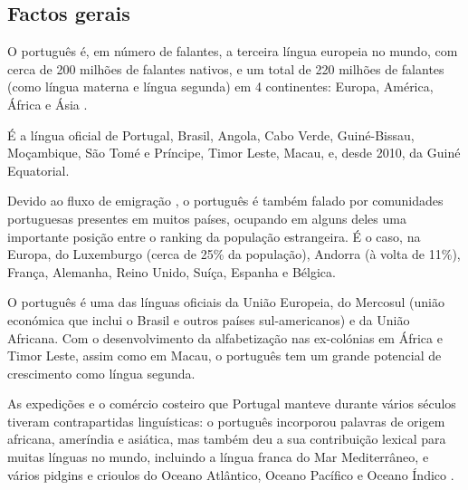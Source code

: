 \clearpage



\begin{multicols}{2}

\subsection{Factos gerais}

O português é, em número de falantes, a terceira língua europeia no mundo, com cerca de 200 milhões de falantes nativos, e um total de 220 milhões de falantes (como língua materna e língua segunda) em 4 continentes: Europa, América, África e Ásia\cite{observatorio} \cite{ethnologue}.


É a língua oficial de Portugal, Brasil, Angola, Cabo Verde, Guiné-Bissau, Moçambique, São Tomé e Príncipe, Timor Leste, Macau, e, desde 2010, da Guiné Equatorial. 

Devido ao fluxo de emigração \cite{stat1}\cite{obsemig}, o português é também falado por comunidades portuguesas presentes em muitos países, ocupando em alguns deles uma importante posição entre o ranking da população estrangeira. É o caso, na Europa, do Luxemburgo (cerca de 25\% da população), Andorra (à volta de 11\%), França, Alemanha, Reino Unido, Suíça, Espanha e Bélgica\cite{linha}. 

O português é uma das línguas oficiais da União Europeia, do Mercosul (união económica que inclui o Brasil e outros países sul-americanos) e da União Africana. Com o desenvolvimento da alfabetização nas ex-colónias em África e Timor Leste, assim como em Macau, o português tem um grande potencial de crescimento como língua segunda. 

As expedições e o comércio costeiro que Portugal manteve durante vários séculos tiveram contrapartidas linguísticas: o português incorporou palavras de origem africana, ameríndia e asiática, mas também deu a sua contribuição lexical para muitas línguas no mundo, incluindo a língua franca do Mar Mediterrâneo, e vários pidgins e crioulos do Oceano Atlântico, Oceano Pacífico e Oceano Índico\cite{andrade} \cite{camoes}. 


\end{multicols}
